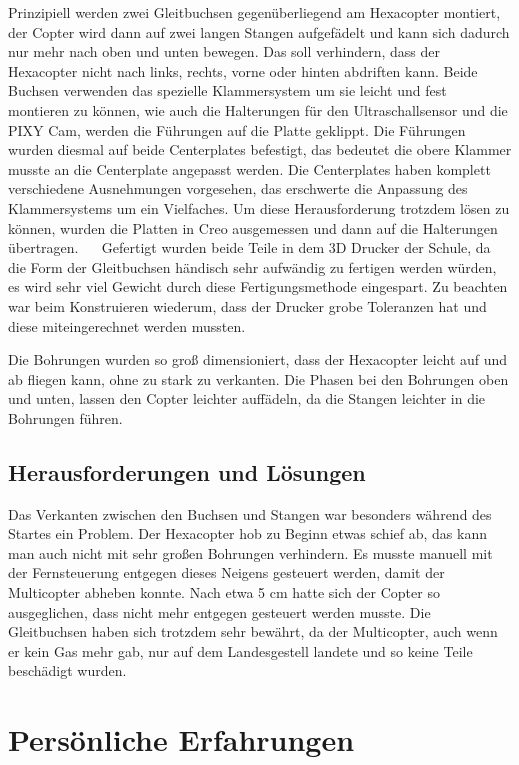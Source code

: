 	Prinzipiell werden zwei Gleitbuchsen gegenüberliegend am Hexacopter montiert, der Copter wird dann auf zwei langen Stangen aufgefädelt und kann sich dadurch nur mehr nach oben und unten bewegen.
	Das soll verhindern, dass der Hexacopter nicht nach links, rechts, vorne oder hinten abdriften kann.
	Beide Buchsen verwenden das spezielle Klammersystem um sie leicht und fest montieren zu können, wie auch die Halterungen für den Ultraschallsensor und die PIXY Cam, werden die Führungen auf die Platte geklippt.
	Die Führungen wurden diesmal auf beide Centerplates befestigt, das bedeutet die obere Klammer musste an die Centerplate angepasst werden.
	Die Centerplates haben komplett verschiedene Ausnehmungen vorgesehen, das erschwerte die Anpassung des Klammersystems um ein Vielfaches.
	Um diese Herausforderung trotzdem lösen zu können, wurden die Platten in Creo ausgemessen und dann auf die Halterungen übertragen.
		 
	Gefertigt wurden beide Teile in dem 3D Drucker der Schule, da die Form der Gleitbuchsen händisch sehr aufwändig zu fertigen werden würden, \bzw es wird sehr viel Gewicht durch diese Fertigungsmethode eingespart.
	Zu beachten war beim Konstruieren wiederum, dass der Drucker grobe Toleranzen hat und diese miteingerechnet werden mussten.

	Die Bohrungen wurden so groß dimensioniert, dass der Hexacopter leicht auf und ab fliegen kann, ohne zu stark zu verkanten.
	Die Phasen bei den Bohrungen oben und unten, lassen den Copter leichter auffädeln, da die Stangen leichter in die Bohrungen führen.

	\subsection{Herausforderungen und Lösungen}

	Das Verkanten zwischen den Buchsen und Stangen war besonders während des Startes ein Problem.
	Der Hexacopter hob zu Beginn etwas  schief ab, das kann man auch nicht mit sehr großen Bohrungen verhindern.
	Es musste manuell mit der Fernsteuerung entgegen dieses Neigens gesteuert werden, damit der Multicopter abheben konnte.
	Nach etwa 5 cm hatte sich der Copter so ausgeglichen, dass nicht mehr entgegen gesteuert werden musste.
	Die Gleitbuchsen haben sich trotzdem sehr bewährt, da der Multicopter, auch wenn er kein Gas mehr gab, nur auf dem Landesgestell landete und so keine Teile beschädigt wurden.

			\newpage

\section{Persönliche Erfahrungen}
